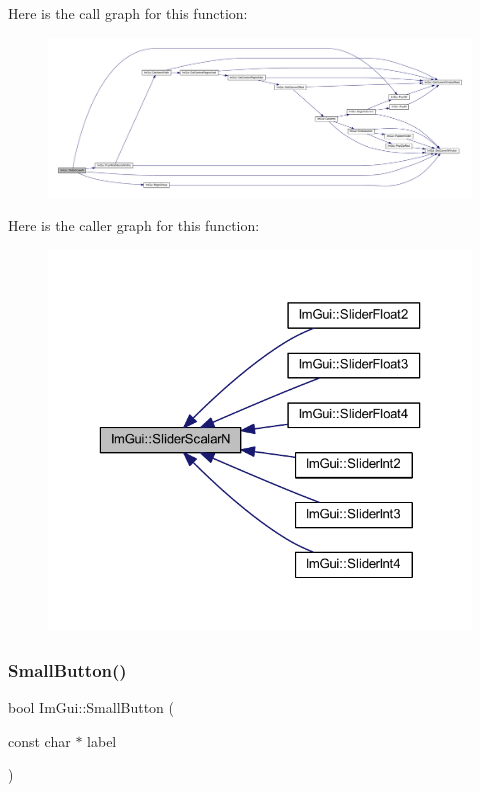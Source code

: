 Here is the call graph for this function\+:
\nopagebreak
\begin{figure}[H]
\begin{center}
\leavevmode
\includegraphics[width=350pt]{namespace_im_gui_a2bb2e8ade96b0b2e64bd12d9db3515d3_cgraph}
\end{center}
\end{figure}
Here is the caller graph for this function\+:
\nopagebreak
\begin{figure}[H]
\begin{center}
\leavevmode
\includegraphics[width=323pt]{namespace_im_gui_a2bb2e8ade96b0b2e64bd12d9db3515d3_icgraph}
\end{center}
\end{figure}
\mbox{\label{namespace_im_gui_a5b76ec69758aeb0a00a66f142f7a4fb2}} 
\subsubsection{\texorpdfstring{Small\+Button()}{SmallButton()}}
{\footnotesize\ttfamily bool Im\+Gui\+::\+Small\+Button (\begin{DoxyParamCaption}\item[{const char $\ast$}]{label }\end{DoxyParamCaption})}

